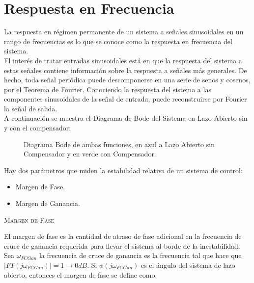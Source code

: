 \documentclass[a4paper,11pt]{article}
\begin{document}
\section{Respuesta en Frecuencia}
\sloppy
La respuesta en régimen permanente de un sistema a señales sinusoidales en un rango de frecuencias es lo que se conoce como la respuesta en frecuencia del sistema.\\
El interés de tratar entradas sinusoidales está en que la respuesta del sistema a estas señales contiene información sobre la respuesta a señales más generales. De hecho, toda señal periódica puede descomponerse en una serie de senos y cosenos, por el Teorema de Fourier. Conociendo la respuesta del sistema a las componentes sinusoidales de la señal de entrada, puede reconstruirse por Fourier la señal de salida.\\
A continuación se muestra el Diagrama de Bode del Sistema en Lazo Abierto sin y con el compensador:\\

	\begin{figure}[H] %
	\caption{Diagrama Bode de ambas funciones, en azul a Lazo Abierto sin Compensador
	y en verde con Compensador.}
	\label{fig:bode1}
	\end{figure}
	
Hay dos parámetros que miden la estabilidad relativa de un sistema de control:
\begin{itemize}
\item Margen de Fase.
\item Margen de Ganancia.
\end{itemize}

\textsc{Margen de Fase}

El margen de fase es la cantidad de atraso de fase adicional en la frecuencia de cruce de ganancia requerida para llevar el sistema al borde de la inestabilidad.\\
Sea $\omega_{FCGan}$ la frecuencia de cruce de ganancia es la frecuencia tal que hace que $|FT(j\omega_{FCGan})|=1\rightarrow 0dB$. Si $\phi(j\omega_{FCGan})$ es el ángulo del sistema de lazo abierto, entonces el margen de fase se define como:
\end{document}

